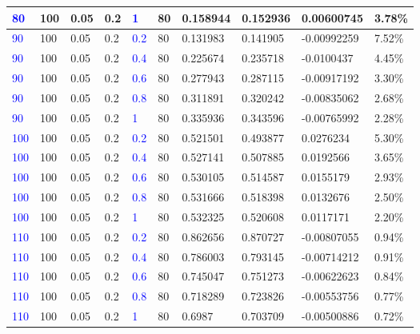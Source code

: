 \documentclass[11pt,oneside,a4paper, titlepage]{article}
\begin{document}
{\begin{tabular}{|l|l|l|l|l|l|l|l|l|l|}
\hline
\textcolor{blue}{80} & 100 & 0.05 & 0.2 & \textcolor{blue}{1} & 80 & 0.158944 & 0.152936 & 0.00600745 & 3.78\%\\
\hline
\textcolor{blue}{90} & 100 & 0.05 & 0.2 & \textcolor{blue}{0.2} & 80 & 0.131983 & 0.141905 & -0.00992259 & 7.52\%\\
\hline
\textcolor{blue}{90} & 100 & 0.05 & 0.2 & \textcolor{blue}{0.4} & 80 & 0.225674 & 0.235718 & -0.0100437 & 4.45\%\\
\hline
\textcolor{blue}{90} & 100 & 0.05 & 0.2 & \textcolor{blue}{0.6} & 80 & 0.277943 & 0.287115 & -0.00917192 & 3.30\%\\
\hline
\textcolor{blue}{90} & 100 & 0.05 & 0.2 & \textcolor{blue}{0.8} & 80 & 0.311891 & 0.320242 & -0.00835062 & 2.68\%\\
\hline
\textcolor{blue}{90} & 100 & 0.05 & 0.2 & \textcolor{blue}{1} & 80 & 0.335936 & 0.343596 & -0.00765992 & 2.28\%\\
\hline
\textcolor{blue}{100} & 100 & 0.05 & 0.2 & \textcolor{blue}{0.2} & 80 & 0.521501 & 0.493877 & 0.0276234 & 5.30\%\\
\hline
\textcolor{blue}{100} & 100 & 0.05 & 0.2 & \textcolor{blue}{0.4} & 80 & 0.527141 & 0.507885 & 0.0192566 & 3.65\%\\
\hline
\textcolor{blue}{100} & 100 & 0.05 & 0.2 & \textcolor{blue}{0.6} & 80 & 0.530105 & 0.514587 & 0.0155179 & 2.93\%\\
\hline
\textcolor{blue}{100} & 100 & 0.05 & 0.2 & \textcolor{blue}{0.8} & 80 & 0.531666 & 0.518398 & 0.0132676 & 2.50\%\\
\hline
\textcolor{blue}{100} & 100 & 0.05 & 0.2 & \textcolor{blue}{1} & 80 & 0.532325 & 0.520608 & 0.0117171 & 2.20\%\\
\hline
\textcolor{blue}{110} & 100 & 0.05 & 0.2 & \textcolor{blue}{0.2} & 80 & 0.862656 & 0.870727 & -0.00807055 & 0.94\%\\
\hline
\textcolor{blue}{110} & 100 & 0.05 & 0.2 & \textcolor{blue}{0.4} & 80 & 0.786003 & 0.793145 & -0.00714212 & 0.91\%\\
\hline
\textcolor{blue}{110} & 100 & 0.05 & 0.2 & \textcolor{blue}{0.6} & 80 & 0.745047 & 0.751273 & -0.00622623 & 0.84\%\\
\hline
\textcolor{blue}{110} & 100 & 0.05 & 0.2 & \textcolor{blue}{0.8} & 80 & 0.718289 & 0.723826 & -0.00553756 & 0.77\%\\
\hline
\textcolor{blue}{110} & 100 & 0.05 & 0.2 & \textcolor{blue}{1} & 80 & 0.6987 & 0.703709 & -0.00500886 & 0.72\%\\
\hline
\end{tabular}
}
\end{document}
